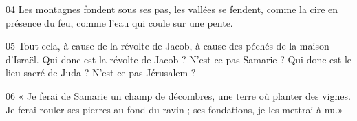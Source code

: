 
04 Les montagnes fondent sous ses pas, les vallées se fendent, comme la cire en présence du feu, comme l’eau qui coule sur une pente.

05 Tout cela, à cause de la révolte de Jacob, à cause des péchés de la maison d’Israël. Qui donc est la révolte de Jacob ? N’est-ce pas Samarie ? Qui donc est le lieu sacré de Juda ? N’est-ce pas Jérusalem ?

06 « Je ferai de Samarie un champ de décombres, une terre où planter des vignes. Je ferai rouler ses pierres au fond du ravin ; ses fondations, je les mettrai à nu.»

